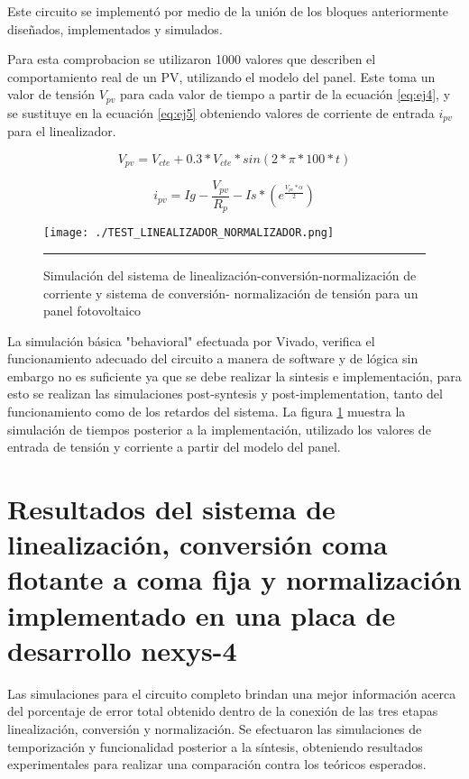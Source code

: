 Este circuito se implementó por medio de la unión de los bloques anteriormente diseñados, implementados y simulados. 

Para esta comprobacion se utilizaron 1000 valores que describen el comportamiento real de un PV, utilizando el modelo del panel.  Este toma un valor de tensión $ V_{pv} $ para cada valor de tiempo a partir de la ecuación \ref{eq:ej4}, y se sustituye en la ecuación \ref{eq:ej5} obteniendo valores de corriente de entrada $ i_{pv} $ para el linealizador. 

\begin{equation} \label{eq:ej4}
   V_{pv} = V_{cte} + 0.3*V_{cte}*sin(2* \pi *100*t)     
\end{equation}

    
\begin{equation} \label{eq:ej5}
   i_{pv} = Ig - \frac{V_{pv}}{R_p} - Is*\left(e^\frac{V_{pv}* \alpha}{2}\right)         
\end{equation} 

 

\begin{figure}[H]
  \centering
    \texttt{[image: ./TEST\_LINEALIZADOR\_NORMALIZADOR.png]}
    \rule{35em}{0.5pt}
  \caption[Simulación del sistema de linealización-conversión-normalización de corriente y sistema de conversión- normalización de tensión para un panel fotovoltaico]{Simulación del sistema de linealización-conversión-normalización de corriente y sistema de conversión- normalización de tensión para un panel fotovoltaico}
  \label{fig:Sim_Sist}
\end{figure}
\newpage
La simulación básica "behavioral" efectuada por Vivado, verifica el funcionamiento adecuado del circuito a manera de software y de lógica sin embargo no es suficiente ya que se debe realizar la sintesis e implementación, para esto se realizan las simulaciones post-syntesis y post-implementation, tanto del funcionamiento como de los retardos del sistema. La figura \ref{fig:Sim_Sist} muestra la simulación de tiempos posterior a la implementación, utilizado los valores de entrada de tensión y corriente a partir del modelo del panel.

\section{Resultados del sistema de linealización, conversión coma flotante a coma fija y normalización implementado en una placa de desarrollo nexys-4}

Las simulaciones para el circuito completo brindan una mejor información acerca del porcentaje de error total obtenido dentro de la conexión de las tres etapas  linealización, conversión y normalización. Se efectuaron las simulaciones de temporización y funcionalidad posterior a la síntesis, obteniendo resultados experimentales para realizar una comparación contra los teóricos esperados.      
 
